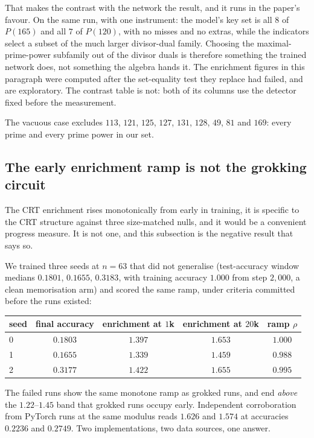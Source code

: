 That makes the contrast with the network the result, and it runs in the paper's favour. On the same run, with one instrument: the model's key set is all $8$ of $P(165)$
and all $7$ of $P(120)$, with no misses and no extras, while the indicators select a subset
of the much larger divisor-dual family. Choosing the maximal-prime-power subfamily out of
the divisor duals is therefore something the trained network does, not something the algebra
hands it. The enrichment figures in this paragraph were computed after the set-equality test
they replace had failed, and are exploratory. The contrast table is not: both of its
columns use the detector fixed before the measurement.

The vacuous case excludes $113$, $121$, $125$, $127$, $131$, $128$, $49$, $81$ and $169$:
every prime and every prime power in our set.

\subsection{The early enrichment ramp is not the grokking circuit}
\label{sec:crt-ramp}

The CRT enrichment rises monotonically from early in training, it is specific to the CRT
structure against three size-matched nulls, and it would be a convenient progress measure. It
is not one, and this subsection is the negative result that says so.

We trained three seeds at $n = 63$ that did not generalise (test-accuracy window medians
$0.1801$, $0.1655$, $0.3183$, with training accuracy $1.000$ from step $2{,}000$, a clean
memorisation arm) and scored the same ramp, under criteria committed before the runs
existed:

\begin{center}
\begin{tabular}{lcccc}
  \toprule
  seed & final accuracy & enrichment at $1$k & enrichment at $20$k & ramp $\rho$ \\
  \midrule
  0 & $0.1803$ & $1.397$ & $\mathbf{1.653}$ & $\mathbf{1.000}$ \\
  1 & $0.1655$ & $1.339$ & $\mathbf{1.459}$ & $\mathbf{0.988}$ \\
  2 & $0.3177$ & $1.422$ & $\mathbf{1.655}$ & $\mathbf{0.995}$ \\
  \bottomrule
\end{tabular}
\end{center}

The failed runs show the same monotone ramp as grokked runs, and end \emph{above} the
$1.22$--$1.45$ band that grokked runs occupy early. Independent corroboration from PyTorch runs
at the same modulus reads $1.626$ and $1.574$ at accuracies $0.2236$ and $0.2749$. Two
implementations, two data sources, one answer.

